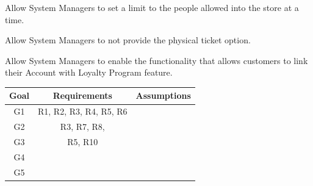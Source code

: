 \begin{enumerate}[label={[R\arabic*]}]
    \item Allow System Managers to set a limit to the people allowed into the store at a time.
    \item Allow System Managers to not provide the physical ticket option.
    \item Allow System Managers to enable the functionality that allows customers to link their Account with Loyalty Program feature.
\end{enumerate}

\begin{center}
    \begin{tabular}{ |c||c|c| }
        \hline
        \textbf{Goal} & \textbf{Requirements} & \textbf{Assumptions} \\
        \hline
        G1 & R1, R2, R3, R4, R5, R6 & \\
        \hline
        G2 & R3, R7, R8, & \\
        \hline
        G3 & R5, R10 & \\
        \hline
        G4 & & \\
        \hline
        G5 & & \\
        \hline
    \end{tabular}
\end{center}

\def\arraystretch{1.5} %
